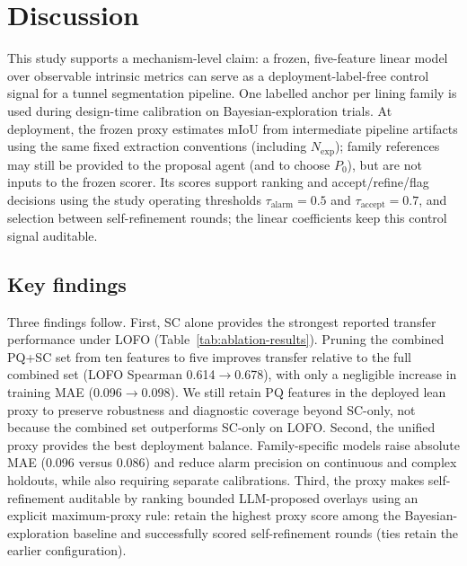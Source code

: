 \documentclass[a4paper,fleqn]{cas-dc}
\begin{document}
{%
\section{Discussion}\label{sec:discussion}

This study supports a mechanism-level claim: a frozen, five-feature linear model over observable intrinsic metrics can serve as a deployment-label-free control signal for a tunnel segmentation pipeline. One labelled anchor per lining family is used during design-time calibration on Bayesian-exploration trials. At deployment, the frozen proxy estimates mIoU from intermediate pipeline artifacts using the same fixed extraction conventions (including $N_{\mathrm{exp}}$); family references may still be provided to the proposal agent (and to choose $P_0$), but are not inputs to the frozen scorer. Its scores support ranking and accept/refine/flag decisions using the study operating thresholds $\tau_{\mathrm{alarm}}=0.5$ and $\tau_{\mathrm{accept}}=0.7$, and selection between self-refinement rounds; the linear coefficients keep this control signal auditable.

\subsection{Key findings}

Three findings follow. First, SC alone provides the strongest reported transfer performance under LOFO (Table~\ref{tab:ablation-results}). Pruning the combined PQ{+}SC set from ten features to five improves transfer relative to the full combined set (LOFO Spearman 0.614$\rightarrow$0.678), with only a negligible increase in training MAE (0.096$\rightarrow$0.098). We still retain PQ features in the deployed lean proxy to preserve robustness and diagnostic coverage beyond SC-only, not because the combined set outperforms SC-only on LOFO.
Second, the unified proxy provides the best deployment
balance. Family-specific models raise absolute MAE (0.096 versus 0.086) and
reduce alarm precision on continuous and complex holdouts, while also requiring
separate calibrations.
Third, the proxy makes self-refinement auditable by ranking bounded LLM-proposed overlays using an explicit maximum-proxy rule: retain the highest proxy score among the Bayesian-exploration baseline and successfully scored self-refinement rounds (ties retain the earlier configuration).

}
\end{document}
